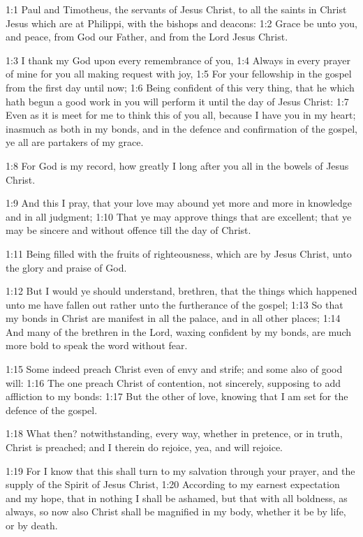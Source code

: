 

1:1 Paul and Timotheus, the servants of Jesus Christ, to all the
saints in Christ Jesus which are at Philippi, with the bishops and
deacons: 1:2 Grace be unto you, and peace, from God our Father, and
from the Lord Jesus Christ.

1:3 I thank my God upon every remembrance of you, 1:4 Always in every
prayer of mine for you all making request with joy, 1:5 For your
fellowship in the gospel from the first day until now; 1:6 Being
confident of this very thing, that he which hath begun a good work in
you will perform it until the day of Jesus Christ: 1:7 Even as it is
meet for me to think this of you all, because I have you in my heart;
inasmuch as both in my bonds, and in the defence and confirmation of
the gospel, ye all are partakers of my grace.

1:8 For God is my record, how greatly I long after you all in the
bowels of Jesus Christ.

1:9 And this I pray, that your love may abound yet more and more in
knowledge and in all judgment; 1:10 That ye may approve things that
are excellent; that ye may be sincere and without offence till the day
of Christ.

1:11 Being filled with the fruits of righteousness, which are by Jesus
Christ, unto the glory and praise of God.

1:12 But I would ye should understand, brethren, that the things which
happened unto me have fallen out rather unto the furtherance of the
gospel; 1:13 So that my bonds in Christ are manifest in all the
palace, and in all other places; 1:14 And many of the brethren in the
Lord, waxing confident by my bonds, are much more bold to speak the
word without fear.

1:15 Some indeed preach Christ even of envy and strife; and some also
of good will: 1:16 The one preach Christ of contention, not sincerely,
supposing to add affliction to my bonds: 1:17 But the other of love,
knowing that I am set for the defence of the gospel.

1:18 What then? notwithstanding, every way, whether in pretence, or in
truth, Christ is preached; and I therein do rejoice, yea, and will
rejoice.

1:19 For I know that this shall turn to my salvation through your
prayer, and the supply of the Spirit of Jesus Christ, 1:20 According
to my earnest expectation and my hope, that in nothing I shall be
ashamed, but that with all boldness, as always, so now also Christ
shall be magnified in my body, whether it be by life, or by death.

